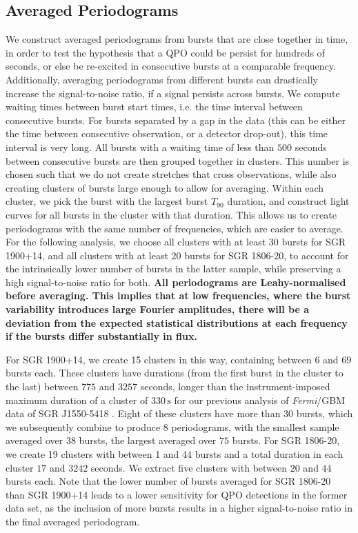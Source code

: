 \documentclass[numberedappendix]{emulateapj}
\newcommand{\project}[1]{\textsl{#1}}
\newcommand{\fermi}{\project{Fermi}}
\begin{document}
\subsection{Averaged Periodograms}
\label{sec:psd_average}
We construct averaged periodograms from bursts that are close together in time, in order to test the hypothesis that a QPO could be persist for hundreds of seconds, or else be re-excited in consecutive bursts at a comparable frequency. Additionally, averaging periodograms from different bursts can drastically increase the signal-to-noise ratio, if a signal persists across bursts. We compute waiting times between burst start times, i.e. the time interval between consecutive bursts. For bursts separated by a gap in the data (this can be either the time between consecutive observation, or a detector drop-out), this time interval is very long. All bursts with a waiting time of less than $500$ seconds between consecutive bursts are then grouped together in clusters. This number is chosen such that we do not create stretches that cross observations, while also creating clusters of bursts large enough to allow for averaging. Within each cluster, we pick the burst with the largest burst $T_{90}$ duration, and construct light curves for all bursts in the cluster with that duration. This allows us to create periodograms with the same number of frequencies, which are easier to average. For the following analysis, we choose all clusters with at least 30 bursts for SGR 1900+14, and all clusters with at least 20 bursts for SGR 1806-20, to account for the intrinsically lower number of bursts in the latter sample, while preserving a high signal-to-noise ratio for both. \textbf{All periodograms are Leahy-normalised before averaging. This implies that at low frequencies, where the burst variability introduces large Fourier amplitudes, there will be a deviation from the expected statistical distributions at each frequency if the bursts differ substantially in flux.}

For SGR 1900+14, we create 15 clusters in this way, containing between $6$ and $69$ bursts each. These clusters have durations (from the first burst in the cluster to the last) between $775$ and $3257$ seconds, longer than the instrument-imposed maximum duration of a cluster of $330 \, \mathrm{s}$ for our previous analysis of \fermi/GBM data of SGR J1550-5418 \citep{huppenkothen2014}. Eight of these clusters have more than $30$ bursts, which we subsequently combine to produce 8 periodograms, with the smallest sample averaged over $38$ bursts, the largest averaged over $75$ bursts.
For SGR 1806-20, we create 19 clusters with between 1 and 44 bursts and a total duration in each cluster $17$ and $3242$ seconds. We extract five clusters with between $20$ and $44$ bursts each. Note that the lower number of bursts averaged for SGR 1806-20 than SGR 1900+14 leads to a lower sensitivity for QPO detections in the former data set, as the inclusion of more bursts results in a higher signal-to-noise ratio in the final averaged periodogram.
\end{document}
